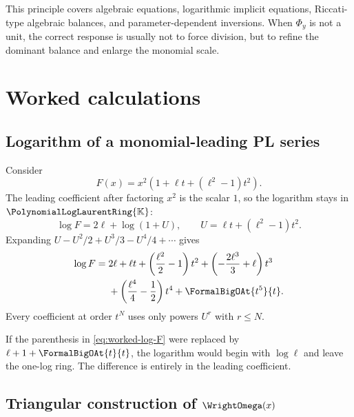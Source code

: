 \documentclass[11pt,oneside]{article}
\numberwithin{equation}{section}
\theoremstyle{definition}
\newcommand{\K}{\mathbb{K}}
\newcommand{\PL}{\PolynomialLogLaurentRing{\K}}
\begin{document}
This principle covers algebraic equations, logarithmic implicit equations,
Riccati-type algebraic balances, and parameter-dependent inversions.  When
\(\Phi_y\) is not a unit, the correct response is usually not to force division,
but to refine the dominant balance and enlarge the monomial scale.

\section{Worked calculations}\label{sec:worked}

\subsection{Logarithm of a monomial-leading PL series}

Consider
\begin{equation}\label{eq:worked-log-F}
  F(x)=x^2\left(1+\ell t+(\ell^2-1)t^2\right).
\end{equation}
The leading coefficient after factoring \(x^2\) is the scalar \(1\), so the
logarithm stays in \(\PL\):
\[
  \log F=2\ell+\log(1+U),
  \qquad U=\ell t+(\ell^2-1)t^2.
\]
Expanding \(U-U^2/2+U^3/3-U^4/4+\cdots\) gives
\begin{align}
 \log F={}&2\ell+\ell t
 +\left(\frac{\ell^2}{2}-1\right)t^2
 +\left(-\frac{2\ell^3}{3}+\ell\right)t^3\nonumber\\
 &+\left(\frac{\ell^4}{4}-\frac12\right)t^4
 +\FormalBigOAt{t^5}{t}.
 \label{eq:worked-log-result}
\end{align}
Every coefficient at order \(t^N\) uses only powers \(U^r\) with \(r\le N\).

If the parenthesis in \eqref{eq:worked-log-F} were replaced by
\(\ell+1+\FormalBigOAt{t}{t}\), the logarithm would begin with \(\log\ell\) and leave the
one-log ring.  The difference is entirely in the leading coefficient.

\subsection{Triangular construction of \(\WrightOmega(x)\)}
\end{document}

